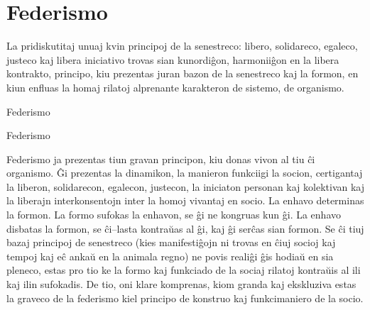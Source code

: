 \section*{Federismo}
\indent 

La pridiskutitaj unuaj kvin principoj de la senestreco: libero, solidareco, egaleco, justeco kaj libera iniciativo trovas sian kunordiĝon, harmoniiĝon en la libera kontrakto, principo, kiu prezentas juran bazon de la senestreco kaj la formon, en kiun enfluas la homaj rilatoj alprenante karakteron de sistemo, de organismo.

Federismo

Federismo

Federismo ja prezentas tiun gravan principon, kiu donas vivon al tiu ĉi organismo. Ĝi prezentas la dinamikon, la manieron funkciigi la socion, certigantaj la liberon, solidarecon, egalecon, justecon, la iniciaton personan kaj kolektivan kaj la liberajn interkonsentojn inter la homoj vivantaj en socio. La enhavo determinas la formon. La formo sufokas la enhavon, se ĝi ne kongruas kun ĝi. La enhavo disbatas la formon, se ĉi–lasta kontraŭas al ĝi, kaj ĝi serĉas sian formon. Se ĉi tiuj bazaj principoj de senestreco (kies manifestiĝojn ni trovas en ĉiuj socioj kaj tempoj kaj eĉ ankaŭ en la animala regno) ne povis realiĝi ĝis hodiaŭ en sia pleneco, estas pro tio ke la formo kaj funkciado de la sociaj rilatoj kontraŭis al ili kaj ilin sufokadis. De tio, oni klare komprenas, kiom granda kaj ekskluziva estas la graveco de la federismo kiel principo de konstruo kaj funkcimaniero de la socio.


